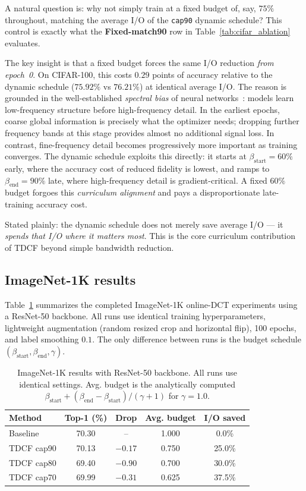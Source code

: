 \documentclass[10pt,twocolumn]{article}
\begin{document}
A natural question is: why not simply train at a fixed budget of, say, $75\%$ throughout, matching the average I/O of the \texttt{cap90} dynamic schedule? This control is exactly what the \textbf{Fixed-match90} row in Table~\ref{tab:cifar_ablation} evaluates.

The key insight is that a fixed budget forces the same I/O reduction \emph{from epoch~0}. On CIFAR-100, this costs $0.29$ points of accuracy relative to the dynamic schedule ($75.92\%$ vs $76.21\%$) at identical average I/O. The reason is grounded in the well-established \emph{spectral bias} of neural networks~\cite{rahaman2019spectral}: models learn low-frequency structure before high-frequency detail. In the earliest epochs, coarse global information is precisely what the optimizer needs; dropping further frequency bands at this stage provides almost no additional signal loss. In contrast, fine-frequency detail becomes progressively more important as training converges. The dynamic schedule exploits this directly: it starts at $\beta_{\mathrm{start}} = 60\%$ early, where the accuracy cost of reduced fidelity is lowest, and ramps to $\beta_{\mathrm{end}} = 90\%$ late, where high-frequency detail is gradient-critical. A fixed $60\%$ budget forgoes this \emph{curriculum alignment} and pays a disproportionate late-training accuracy cost.

Stated plainly: the dynamic schedule does not merely save average I/O — it \emph{spends that I/O where it matters most}. This is the core curriculum contribution of TDCF beyond simple bandwidth reduction.

\subsection{ImageNet-1K results}

Table~\ref{tab:imagenet_results} summarizes the completed ImageNet-1K online-DCT experiments using a ResNet-50 backbone. All runs use identical training hyperparameters, lightweight augmentation (random resized crop and horizontal flip), 100 epochs, and label smoothing $0.1$. The only difference between runs is the budget schedule $(\beta_{\mathrm{start}}, \beta_{\mathrm{end}}, \gamma)$.

\begin{table}[t]
\centering
\small
\caption{ImageNet-1K results with ResNet-50 backbone. All runs use identical settings. Avg. budget is the analytically computed $\beta_{\mathrm{start}} + (\beta_{\mathrm{end}} - \beta_{\mathrm{start}})/(\gamma + 1)$ for $\gamma=1.0$.}
\label{tab:imagenet_results}
\begin{tabular}{lcccc}
\toprule
Method & Top-1 (\%) & Drop & Avg. budget & I/O saved \\
\midrule
Baseline & 70.30 & -- & 1.000 & 0.0\% \\
TDCF cap90 & 70.13 & $-0.17$ & 0.750 & 25.0\% \\
TDCF cap80 & 69.40 & $-0.90$ & 0.700 & 30.0\% \\
TDCF cap70 & 69.99 & $-0.31$ & 0.625 & 37.5\% \\
\bottomrule
\end{tabular}
\end{table}
\end{document}
